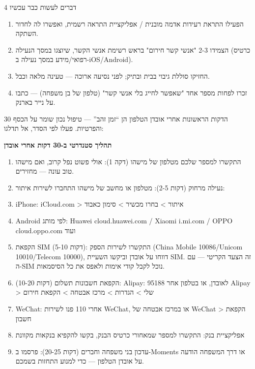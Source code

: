 \begin{tcbpractice}{4 דברים לעשות כבר עכשיו}
\begin{enumerate}
  \item הפעילו התראת רעידות אדמה מובנית / אפליקציית התראה רשמית, ואפשרו לה לחדור השתקה.
  \item הצמידו 2-3 "אנשי קשר חירום" בראש רשימת אנשי הקשר, שיוצגו במסך הנעילה (כרטיס רפואי/מידע במסך נעילה ב-iOS/Android).
  \item החזיקו סוללת גיבוי בבית ובתיק; לפני נסיעה ארוכה — טעינה מלאה וכבל.
  \item זכרו לפחות מספר אחד "שאפשר לחייג בלי אנשי קשר" (טלפון של בן משפחה) — כתבו על נייר בארנק.
\end{enumerate}

\end{tcbpractice}


30 הדקות הראשונות אחרי אובדן הטלפון הן “זמן זהב” — טיפול נכון שומר על הכסף והפרטיות. פעלו לפי הסדר, אל תדלגו:

\textbf{תהליך סטנדרטי ב-30 דקות אחרי אובדן}\par

\begin{enumerate}
  \item התקשרו למספר שלכם מטלפון של מישהו (דקה 1): אולי פשוט נפל קרוב, ואם מישהו טוב עונה — מחזירים.
  \item נעילה מרחוק (דקות 2-5): מטלפון או מחשב של מישהו התחברו לשירות איתור:
  \item iPhone: iCloud.com > איתור > בחרו מכשיר > סימון כאבוד
  \item Android לפי מותג: Huawei cloud.huawei.com / Xiaomi i.mi.com / OPPO cloud.oppo.com ועוד
  \item הקפאת SIM (דקות 5-10): התקשרו לשירות הספק (China Mobile 10086/Unicom 10010/Telecom 10000), דווחו על אובדן וביקשו השעיית SIM. זה הצעד הקריטי — עם ה-SIM נוכל לקבל קודי אימות ולאפס את כל הסיסמאות.
  \item הקפאת חשבונות תשלום (דקות 10-20): Alipay: 95188 לאובדן, או בטלפון אחר Alipay > שלי > הגדרות > מרכז אבטחה > הקפאת חירום
  \item WeChat: אחרי 110 פנו לשירות WeChat, או במרכז אבטחה של WeChat > הקפאת חשבון
  \item אפליקציית בנק: התקשרו למספר שמאחורי כרטיס הבנק, בקשו להקפיא בנקאות מקוונת
  \item עדכון בני משפחה וחברים (דקות 20-25): פרסמו ב-Moments או דרך המשפחה הודעה על אובדן הטלפון — כדי למנוע התחזות בשמכם.
\end{enumerate}


